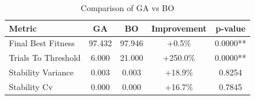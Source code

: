 \begin{table}[htbp]
\centering
\caption{Comparison of GA vs BO}
\label{tab:comparison}
\begin{tabular}{lcccc}
\hline
Metric & GA & BO & Improvement & p-value \\
\hline
Final Best Fitness & 97.432 & 97.946 & +0.5\% & 0.0000** \\
Trials To Threshold & 6.000 & 21.000 & +250.0\% & 0.0000** \\
Stability Variance & 0.003 & 0.003 & +18.9\% & 0.8254 \\
Stability Cv & 0.000 & 0.000 & +16.7\% & 0.7845 \\
\hline
\end{tabular}
\end{table}


